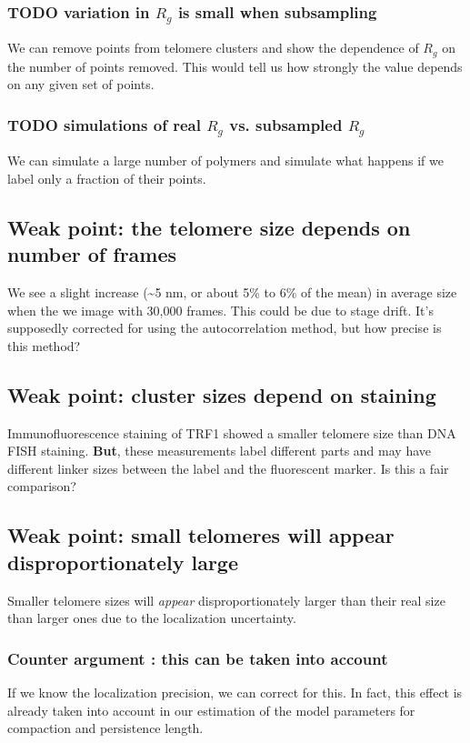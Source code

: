 \documentclass[12pt, a4paper]{article}
\begin{document}
\subsubsection{{\bfseries\sffamily TODO} variation in $R_g$ is small when subsampling}
\label{sec-1-4-1}
We can remove points from telomere clusters and show the
dependence of $R_g$ on the number of points removed. This would
tell us how strongly the value depends on any given set of points.

\subsubsection{{\bfseries\sffamily TODO} simulations of real $R_g$ vs. subsampled $R_g$}
\label{sec-1-4-2}
We can simulate a large number of polymers and simulate what
happens if we label only a fraction of their points.

\subsection{Weak point: the telomere size depends on number of frames}
\label{sec-1-5}
We see a slight increase (\textasciitilde{}5 nm, or about 5\% to 6\% of the mean)
in average size when the we image with 30,000 frames. This could be
due to stage drift. It's supposedly corrected for using the
autocorrelation method, but how precise is this method?

\subsection{Weak point: cluster sizes depend on staining}
\label{sec-1-6}
Immunofluorescence staining of TRF1 showed a smaller telomere size
than DNA FISH staining. \textbf{But}, these measurements label
different parts and may have different linker sizes between the
label and the fluorescent marker. Is this a fair comparison?

\subsection{Weak point: small telomeres will appear disproportionately large}
\label{sec-1-7}
Smaller telomere sizes will \textit{appear} disproportionately
larger than their real size than larger ones due to the
localization uncertainty.

\subsubsection{Counter argument : this can be taken into account}
\label{sec-1-7-1}
If we know the localization precision, we can correct for this. In
fact, this effect is already taken into account in our estimation
of the model parameters for compaction and persistence length.
\end{document}
